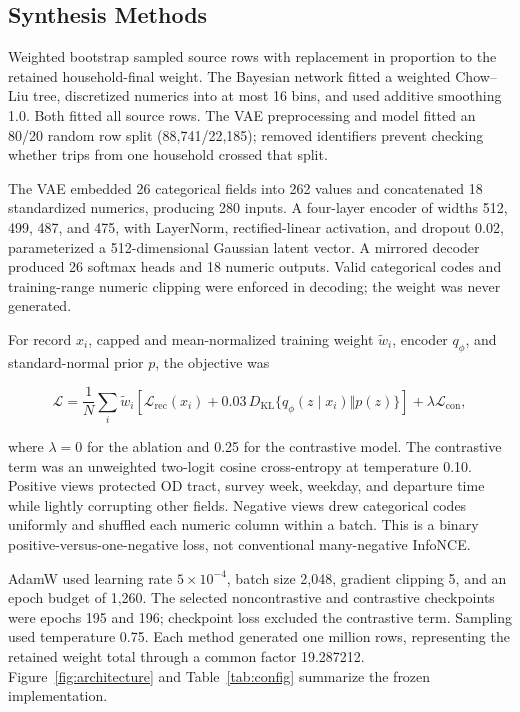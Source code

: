 \documentclass[numbered]{trbunofficial}
\begin{document}


\subsection{Synthesis Methods}

Weighted bootstrap sampled source rows with replacement in proportion to the retained household-final weight. The Bayesian network fitted a weighted Chow--Liu tree, discretized numerics into at most 16 bins, and used additive smoothing 1.0. Both fitted all source rows. The VAE preprocessing and model fitted an 80/20 random row split (88,741/22,185); removed identifiers prevent checking whether trips from one household crossed that split.

The VAE embedded 26 categorical fields into 262 values and concatenated 18 standardized numerics, producing 280 inputs. A four-layer encoder of widths 512, 499, 487, and 475, with LayerNorm, rectified-linear activation, and dropout 0.02, parameterized a 512-dimensional Gaussian latent vector. A mirrored decoder produced 26 softmax heads and 18 numeric outputs. Valid categorical codes and training-range numeric clipping were enforced in decoding; the weight was never generated.

For record $x_i$, capped and mean-normalized training weight $\widetilde w_i$, encoder $q_\phi$, and standard-normal prior $p$, the objective was

\begin{linenomath*}
\begin{equation}
\mathcal L=\frac{1}{N}\sum_i \widetilde w_i\!\left[\mathcal L_{\mathrm{rec}}(x_i)+0.03\,D_{\mathrm{KL}}\{q_\phi(z\mid x_i)\Vert p(z)\}\right]+\lambda\mathcal L_{\mathrm{con}},
\label{eq:objective}
\end{equation}
\end{linenomath*}
where $\lambda=0$ for the ablation and 0.25 for the contrastive model. The contrastive term was an unweighted two-logit cosine cross-entropy at temperature 0.10. Positive views protected OD tract, survey week, weekday, and departure time while lightly corrupting other fields. Negative views drew categorical codes uniformly and shuffled each numeric column within a batch. This is a binary positive-versus-one-negative loss, not conventional many-negative InfoNCE.

AdamW used learning rate $5\times10^{-4}$, batch size 2,048, gradient clipping 5, and an epoch budget of 1,260. The selected noncontrastive and contrastive checkpoints were epochs 195 and 196; checkpoint loss excluded the contrastive term. Sampling used temperature 0.75. Each method generated one million rows, representing the retained weight total through a common factor 19.287212. Figure~\ref{fig:architecture} and Table~\ref{tab:config} summarize the frozen implementation.
\end{document}
